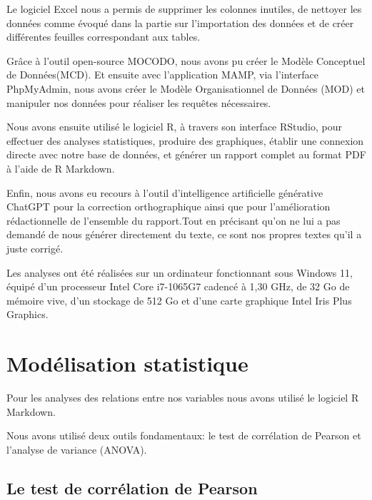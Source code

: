 \documentclass[mstat,12pt]{unswthesis}
\begin{document}
\medskip

Le logiciel Excel nous a permis de supprimer les colonnes inutiles, de
nettoyer les données comme évoqué dans la partie sur l'importation des
données et de créer différentes feuilles correspondant aux tables.

\medskip

Grâce à l'outil open-source MOCODO, nous avons pu créer le Modèle
Conceptuel de Données(MCD). Et ensuite avec l'application MAMP, via
l'interface PhpMyAdmin, nous avons créer le Modèle Organisationnel de
Données (MOD) et manipuler nos données pour réaliser les requêtes
nécessaires.

\medskip

Nous avons ensuite utilisé le logiciel R, à travers son interface
RStudio, pour effectuer des analyses statistiques, produire des
graphiques, établir une connexion directe avec notre base de données, et
générer un rapport complet au format PDF à l'aide de R Markdown.

\medskip

Enfin, nous avons eu recours à l'outil d'intelligence artificielle
générative ChatGPT pour la correction orthographique ainsi que pour
l'amélioration rédactionnelle de l'ensemble du rapport.Tout en précisant
qu'on ne lui a pas demandé de nous générer directement du texte, ce sont
nos propres textes qu'il a juste corrigé.

\medskip

Les analyses ont été réalisées sur un ordinateur fonctionnant sous
Windows 11, équipé d'un processeur Intel Core i7-1065G7 cadencé à 1,30
GHz, de 32 Go de mémoire vive, d'un stockage de 512 Go et d'une carte
graphique Intel Iris Plus Graphics.

\section{Modélisation statistique}\label{moduxe9lisation-statistique}

Pour les analyses des relations entre nos variables nous avons utilisé
le logiciel R Markdown.

\medskip

Nous avons utilisé deux outils fondamentaux: le test de corrélation de
Pearson et l'analyse de variance (ANOVA).

\bigskip

\subsection{Le test de corrélation de
Pearson}\label{le-test-de-corruxe9lation-de-pearson}
\end{document}
